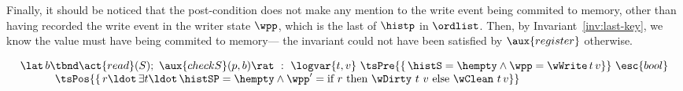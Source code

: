 
Finally, it should be noticed that the post-condition does not make
any mention to the write event being commited to memory, other than
having recorded the write event in the writer state $\wpp$, which is
the last of $\histp$ in $\ordlist$. Then, by
Invariant~\ref{inv:last-key}, we know the value must have being
commited to memory--- the invariant could not have been satisfied by
$\aux{register}$ otherwise.


\[
\begin{array}{l}
  \lat\, b \tbnd \act{read}(S);\ \aux{checkS}(p,b) \rat\ :\
    \logvar{t, v}\
    \tsPre{\{\, \histS = \hempty \wedge
      \wpp = \wWrite\, t\, v \}}\ \esc{bool} \\
    ~~~~ ~~~~
    \begin{array}[t]{l}
      \tsPos{\{\, r\ldot\, \exists t\ldot\, \histSP = \hempty \wedge
        \wpp' =  \textrm{if}\ r\
        \textrm{then}\ \wDirty\ t\, \,v\ \textrm{else}\ \wClean\ t\, v\}}
    \end{array}
\end{array}
\]


